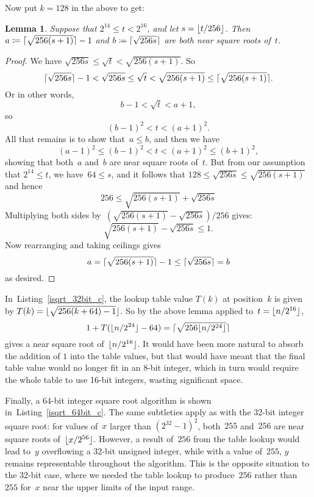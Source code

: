 \documentclass[a4paper]{article}
\DeclarePairedDelimiter\floor{\lfloor}{\rfloor}
\DeclarePairedDelimiter\ceil{\lceil}{\rceil}
\newcommand{\isqrt}[1]{\floor{\sqrt{#1}}}
\newcommand{\csqrt}[1]{\ceil{\sqrt{#1}}}
\theoremstyle{plain}
\newtheorem{lemma}[theorem]{Lemma}
\theoremstyle{definition}
\begin{document}
Now put $k=128$ in the above to get:

\begin{lemma} Suppose that $2^{14} \le t < 2^{16}$, and let $s = \floor{t /
256}$. Then $a \coloneqq \csqrt{256(s+1)} - 1$ and $b \coloneqq \csqrt{256s}$
are both near square roots of~$t$.
\end{lemma}

\begin{proof}
We have $\sqrt{256s} \le \sqrt{t} <
\sqrt{256(s+1)}$. So
$$\csqrt{256s} - 1 < \sqrt{256s} \le \sqrt t < \sqrt{256(s+1)} \le \csqrt{256(s+1)}.$$
Or in other words,
$$b - 1 < \sqrt t < a + 1,$$
so
$$(b - 1)^2 < t < (a + 1)^2.$$
All that remains is to show that~$a\le b$, and then we have
$$(a - 1)^2 \le (b - 1)^2 < t < (a + 1)^2 \le (b + 1)^2,$$ showing that
both~$a$ and~$b$ are near square roots of~$t$. But from our assumption that
$2^{14} \le t$, we have~$64 \le s$, and it follows that $128 \le \sqrt{256s}
\le \sqrt{256(s+1)}$ and hence
$$256 \le \sqrt{256(s+1)} + \sqrt{256s}$$ Multiplying both sides
by~$(\sqrt{256(s+1)} - \sqrt{256s}) / 256$ gives:
$$\sqrt{256(s+1)} - \sqrt{256s} \le 1.$$ Now rearranging and taking ceilings
gives
$$a = \csqrt{256(s+1)} - 1 \le \csqrt{256s} = b$$ as desired.
\end{proof}

In~Listing~\ref{isqrt_32bit_c}, the lookup table value $T(k)$ at position~$k$
is given by $T(k) = \isqrt{256(k + 64) - 1}$. So by the above lemma applied
to~$t=\floor{n / 2^{16}}$,
$$1 + T(\floor{n / 2^{24}} - 64) = \csqrt{256 \floor{n / 2^{24}}}$$ gives a
near square root of~$\floor{n / 2^{16}}$. It would have been more natural to
absorb the addition of $1$ into the table values, but that would have meant
that the final table value would no longer fit in an 8-bit integer, which in
turn would require the whole table to use 16-bit integers, wasting significant
space.

Finally, a 64-bit integer square root algorithm is shown
in~Listing~\ref{isqrt_64bit_c}. The same subtleties apply as with the 32-bit
integer square root: for values of~$x$ larger than $(2^32 - 1)^2$, both~$255$
and~$256$ are near square roots of~$\floor{x/2^{56}}$. However, a result
of~$256$ from the table lookup would lead to~$y$ overflowing a 32-bit
unsigned integer, while with a value of~$255$, $y$ remains representable
throughout the algorithm. This is the opposite situation to the 32-bit
case, where we needed the table lookup to produce~$256$ rather than $255$
for~$x$ near the upper limits of the input range.
\end{document}
